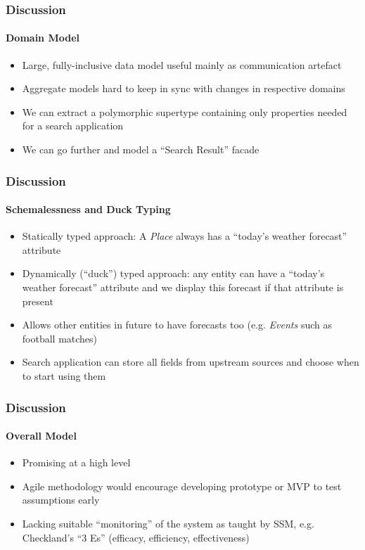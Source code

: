 \documentclass{beamer}
\begin{document}
\begin{frame}
  \frametitle{Discussion}
  \framesubtitle{Domain Model}
  \begin{itemize}
    \pause \item Large, fully-inclusive data model useful mainly as communication artefact
    \pause \item Aggregate models hard to keep in sync with changes in respective domains
    \pause \item We can extract a polymorphic supertype containing only properties needed for a search application
    \pause \item We can go further and model a ``Search Result'' facade
  \end{itemize}
\end{frame}

\begin{frame}
  \frametitle{Discussion}
  \framesubtitle{Schemalessness and Duck Typing}
  \begin{itemize}
    \pause \item Statically typed approach: A \emph{Place} always has a ``today's weather forecast'' attribute
    \pause \item Dynamically (``duck'') typed approach: any entity can have a ``today's weather forecast'' attribute and we display this forecast if that attribute is present
    \pause \item Allows other entities in future to have forecasts too (e.g. \emph{Events} such as football matches)
    \pause \item Search application can store all fields from upstream sources and choose when to start using them
  \end{itemize}
\end{frame}

\begin{frame}
  \frametitle{Discussion}
  \framesubtitle{Overall Model}
  \begin{itemize}
    \pause \item Promising at a high level
    \pause \item Agile methodology would encourage developing prototype or MVP to test assumptions early
    \pause \item Lacking suitable ``monitoring'' of the system as taught by SSM, e.g. Checkland's ``3 Es'' (efficacy, efficiency, effectiveness)
  \end{itemize}
\end{frame}
\end{document}
